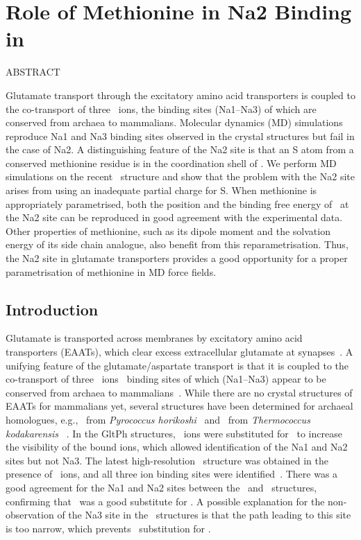 \chapter{Role of Methionine in Na2 Binding in \GltPh}
\label{chap:na2}
ABSTRACT \newline

Glutamate transport through the excitatory amino acid transporters is coupled to the 
co-transport of three \Na\ ions, the binding sites (Na1--Na3) of which are conserved from 
archaea to mammalians. Molecular dynamics (MD) simulations reproduce Na1 and Na3 binding
sites observed in the crystal structures but fail in the case of Na2. A distinguishing 
feature of the Na2 site is that an S atom from a conserved methionine residue is in the 
coordination shell of \Na. We perform MD simulations on the recent \GltTk\ structure 
and show that the problem with the Na2 site arises from using an inadequate partial charge 
for S. When methionine is appropriately parametrised, both the position and the binding 
free energy of \Na\ at the Na2 site can be reproduced in good agreement with the 
experimental data. Other properties of methionine, such as its dipole moment and the 
solvation energy of its side chain analogue, also benefit from this reparametrisation. Thus, 
the Na2 site in glutamate transporters provides a good opportunity for a proper 
parametrisation of methionine in MD force fields.

\newpage
\section{Introduction}
\label{na2:intro}
Glutamate is transported across membranes by excitatory amino acid transporters (EAATs), 
which clear excess extracellular glutamate at synapses~\cite{Danbolt2001}. A unifying 
feature of the glutamate/aspartate transport is that it is coupled to the co-transport 
of three \Na\ ions~\cite{Zerangue1996,Groeneveld2010} binding sites of which (Na1--Na3) 
appear to be conserved from archaea to mammalians~\cite{Vandenberg2013}. While there are 
no crystal structures of EAATs for mammalians yet, several structures have been determined 
for archaeal homologues, e.g., \GltPh\ from {\it Pyrococcus horikoshi}~\cite{Yernool2004,
Boudker2007,Reyes2009,Verdon2012,Verdon2014} and \GltTk\ from {\it Thermococcus kodakarensis
}~\cite{Jensen2013,Guskov2016}. In the GltPh structures, \Tl\ ions were substituted for \Na\ 
to increase the visibility of the bound ions, which allowed identification of the Na1 and Na2 
sites but not Na3. The latest high-resolution \GltTk\ structure was obtained in the presence 
of \Na\ ions, and all three ion binding sites were identified~\cite{Guskov2016}. There was a good 
agreement for the Na1 and Na2 sites between the \GltPh\ and \GltTk\ structures, confirming that 
\Tl\ was a good substitute for \Na. A possible explanation for the non-observation of the Na3 
site in the \GltPh\ structures is that the path leading to this site is too narrow, which 
prevents \Tl\ substitution for \Na.

